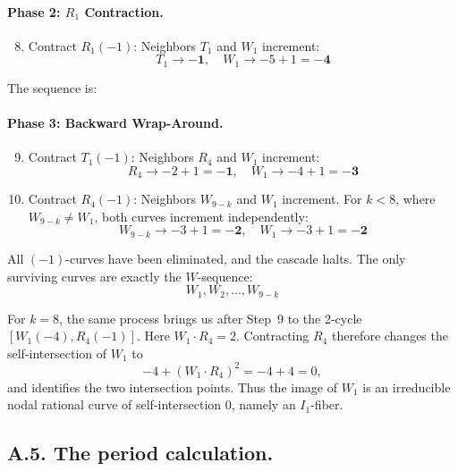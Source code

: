 \documentclass[11pt, reqno]{amsart}
\theoremstyle{definition}
\begin{document}
\paragraph{Phase 2: $R_1$ Contraction.}
\begin{enumerate}\setcounter{enumi}{7}
    \item Contract $R_1(-1)$: Neighbors $T_1$ and $W_1$ increment:
    $$T_1 \to \mathbf{-1}, \quad W_1 \to -5 + 1 = \mathbf{-4}$$
\end{enumerate}
The sequence is:
\begin{equation}
    [\mathbf{W_1(-4)}, W_2(-2), \dots, \mathbf{W_{9-k}(-3)}, \mathbf{R_4(-2)}, \mathbf{T_1(-1)}]
\end{equation}

\paragraph{Phase 3: Backward Wrap-Around.}
\begin{enumerate}\setcounter{enumi}{8}
    \item Contract $T_1(-1)$: Neighbors $R_4$ and $W_1$ increment:
    $$R_4 \to -2 + 1 = \mathbf{-1}, \quad W_1 \to -4 + 1 = \mathbf{-3}$$
    \item Contract $R_4(-1)$: Neighbors $W_{9-k}$ and $W_1$ increment. 
    For $k < 8$, where $W_{9-k} \neq W_1$, both curves increment independently:
    $$W_{9-k} \to -3 + 1 = \mathbf{-2}, \quad W_1 \to -3 + 1 = \mathbf{-2}$$
\end{enumerate}

 All $(-1)$-curves have been eliminated, and the cascade halts. The only surviving curves are exactly the $W$-sequence:
\begin{equation}
    W_1, W_2, \dots, W_{9-k}
\end{equation}

 For \(k=8\), the same process brings us after Step~9 to the
2-cycle \([W_1(-4),R_4(-1)]\). Here \(W_1\cdot R_4=2\). Contracting
\(R_4\) therefore changes the self-intersection of \(W_1\) to
\[
-4+(W_1\cdot R_4)^2=-4+4=0,
\]
and identifies the two intersection points. Thus the image of \(W_1\)
is an irreducible nodal rational curve of self-intersection \(0\), namely
an \(I_1\)-fiber.



\subsection*{A.5. The period calculation.}
\end{document}
